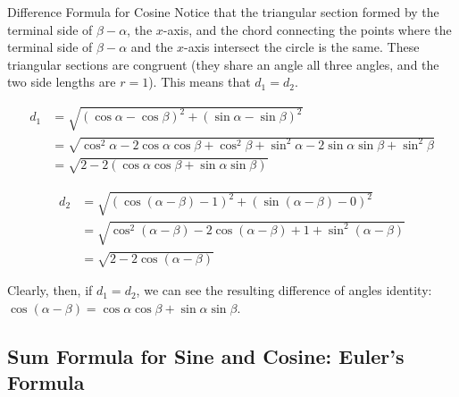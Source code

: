 \begin{prf}{Difference Formula for Cosine}
  Notice that the triangular section formed by the terminal side of $\beta-\alpha$, the $x$-axis, and the chord connecting the points where the terminal side of $\beta-\alpha$ and the $x$-axis intersect the circle is the same. These triangular sections are congruent (they share an angle all three angles, and the two side lengths are $r=1$). This means that $d_1=d_2$.

  \begin{align*}
    d_1 &= \sqrt{(\cos \alpha - \cos\beta)^2+(\sin\alpha - \sin \beta)^2}\\
    &= \sqrt{\cos^2\alpha - 2\cos\alpha\cos\beta + \cos^2\beta + \sin^2\alpha - 2\sin\alpha\sin\beta + \sin^2\beta}\\
    & = \sqrt{2 - 2(\cos\alpha\cos\beta + \sin\alpha\sin\beta)}
  \end{align*}

  \begin{align*}
    d_2 &= \sqrt{(\cos (\alpha-\beta) - 1)^2+(\sin(\alpha - \beta) - 0)^2}\\
    &= \sqrt{\cos^2(\alpha-\beta) - 2\cos(\alpha-\beta) + 1 + \sin^2(\alpha-\beta)}\\
    & = \sqrt{2 - 2\cos(\alpha-\beta)}
  \end{align*}

  Clearly, then, if $d_1 = d_2$, we can see the resulting difference of angles identity: $\cos(\alpha-\beta) = \cos\alpha\cos\beta + \sin\alpha\sin\beta$.
\end{prf}

\subsection{Sum Formula for Sine and Cosine: Euler's Formula}

